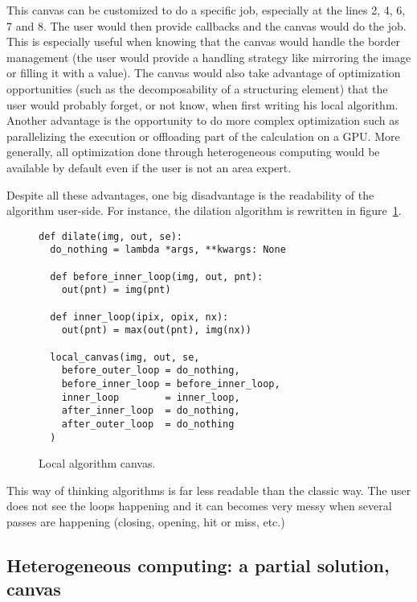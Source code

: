 This canvas can be customized to do a specific job, especially at the lines 2, 4, 6, 7 and 8. The user would then
provide callbacks and the canvas would do the job. This is especially useful when knowing that the canvas would handle
the border management (the user would provide a handling strategy like mirroring the image or filling it with a value).
The canvas would also take advantage of optimization opportunities (such as the decomposability of a structuring
element) that the user would probably forget, or not know, when first writing his local algorithm. Another advantage is
the opportunity to do more complex optimization such as parallelizing the execution or offloading part of the
calculation on a GPU. More generally, all optimization done through heterogeneous computing would be available by
default even if the user is not an area expert.

Despite all these advantages, one big disadvantage is the readability of the algorithm user-side. For instance, the
dilation algorithm is rewritten in figure~\ref{code:local.algorithm.dilate}.

\begin{figure}[tbh]
  \centering
  \begin{verbatim}
def dilate(img, out, se):
  do_nothing = lambda *args, **kwargs: None

  def before_inner_loop(img, out, pnt):
    out(pnt) = img(pnt)
  
  def inner_loop(ipix, opix, nx):
    out(pnt) = max(out(pnt), img(nx))

  local_canvas(img, out, se,
    before_outer_loop = do_nothing,
    before_inner_loop = before_inner_loop,
    inner_loop        = inner_loop,
    after_inner_loop  = do_nothing,
    after_outer_loop  = do_nothing
  )
  \end{verbatim}

  \caption{Local algorithm canvas.}
  \label{code:local.algorithm.dilate}
\end{figure}

This way of thinking algorithms is far less readable than the classic way. The user does not see the loops happening and
it can becomes very messy when several passes are happening (closing, opening, hit or miss, etc.)

\vspace{1cm}


\subsection{Heterogeneous computing: a partial solution, canvas}
\label{subsec:heterogeneous}


